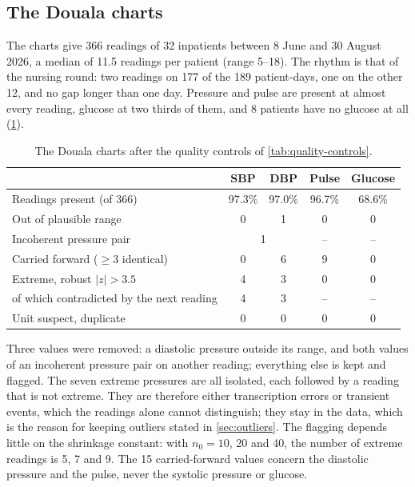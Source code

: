 \subsection{The Douala charts}

The charts give 366 readings of 32 inpatients between 8 June and 30 August 2026, a median of 11.5 readings per patient (range 5--18). The rhythm is that of the nursing round: two readings on 177 of the 189 patient-days, one on the other 12, and no gap longer than one day. Pressure and pulse are present at almost every reading, glucose at two thirds of them, and 8 patients have no glucose at all (\cref{tab:douala-cohort}).

\begin{table}[htbp]
\centering\footnotesize
\caption{The Douala charts after the quality controls of \cref{tab:quality-controls}.}\label{tab:douala-cohort}
\begin{tabular}{@{}lcccc@{}}
\toprule
 & \textbf{SBP} & \textbf{DBP} & \textbf{Pulse} & \textbf{Glucose} \\
\midrule
Readings present (of 366) & 97.3\% & 97.0\% & 96.7\% & 68.6\% \\
Out of plausible range & 0 & 1 & 0 & 0 \\
Incoherent pressure pair & \multicolumn{2}{c}{1} & -- & -- \\
Carried forward ($\geq 3$ identical) & 0 & 6 & 9 & 0 \\
Extreme, robust $\lvert z\rvert > 3.5$ & 4 & 3 & 0 & 0 \\
\quad of which contradicted by the next reading & 4 & 3 & -- & -- \\
Unit suspect, duplicate & 0 & 0 & 0 & 0 \\
\bottomrule
\end{tabular}
\end{table}

Three values were removed: a diastolic pressure outside its range, and both values of an incoherent pressure pair on another reading; everything else is kept and flagged. The seven extreme pressures are all isolated, each followed by a reading that is not extreme. They are therefore either transcription errors or transient events, which the readings alone cannot distinguish; they stay in the data, which is the reason for keeping outliers stated in \cref{sec:outliers}. The flagging depends little on the shrinkage constant: with $n_0 = 10$, 20 and 40, the number of extreme readings is 5, 7 and 9. The 15 carried-forward values concern the diastolic pressure and the pulse, never the systolic pressure or glucose.

